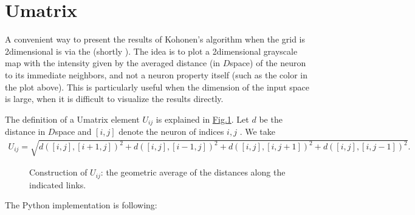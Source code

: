 \documentclass[letterpaper,10pt,english]{jupyterBook}
\let\sphinxpxdimen\pdfpxdimen\else\newdimen\sphinxpxdimen
\begin{document}
\section{U\sphinxhyphen{}matrix}
\label{\detokenize{docs/som:u-matrix}}
\sphinxAtStartPar
A convenient way to present the results of Kohonen’s algorithm when the grid is 2\sphinxhyphen{}dimensional is via the  (shortly ). The idea is to plot a 2\sphinxhyphen{}dimensional grayscale map with the intensity given by the averaged distance (in \(D\)\sphinxhyphen{}space) of the neuron to its immediate neighbors, and not a neuron property itself (such as the color in the plot above). This is particularly useful when the dimension of the input space is large, when it is difficult to visualize the results directly.

\sphinxAtStartPar
The definition of a U\sphinxhyphen{}matrix element \(U_{ij}\) is explained in \hyperref[\detokenize{docs/som:udm-fig}]{Fig.\@ \ref{\detokenize{docs/som:udm-fig}}}. Let \(d\) be the distance in \(D\)\sphinxhyphen{}space and \([i,j]\) denote the neuron of indices \(i,j\) . We take
\begin{equation*}
\begin{split}
U_{ij}=\sqrt{d\left([i,j],[i+1,j]\right)^2+d\left([i,j],[i-1,j]\right)^2+
        d\left([i,j],[i,j+1]\right)^2+d\left([i,j],[i,j-1]\right)^2 }.
\end{split}
\end{equation*}
\begin{figure}[htbp]
\centering
\capstart

\noindent\sphinxincludegraphics[width=150\sphinxpxdimen]{{udm}.png}
\caption{Construction of \(U_{ij}\): the geometric average of the distances along the indicated links.}\label{\detokenize{docs/som:udm-fig}}\end{figure}

\sphinxAtStartPar
The Python implementation is following:
\end{document}
